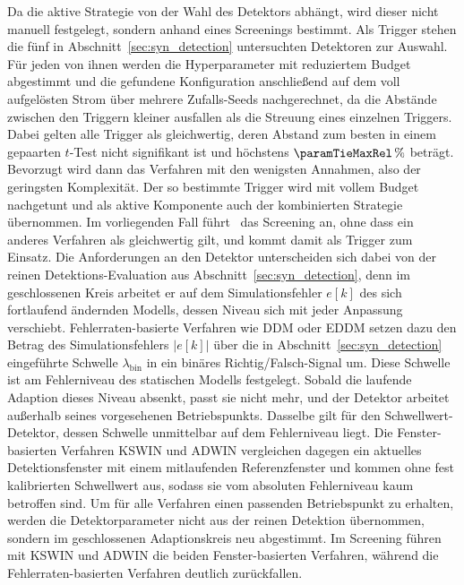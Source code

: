 Da die aktive Strategie von der Wahl des Detektors abhängt, wird dieser nicht manuell festgelegt, sondern anhand eines Screenings bestimmt. Als Trigger stehen die fünf in Abschnitt~\ref{sec:syn_detection} untersuchten Detektoren zur Auswahl. Für jeden von ihnen werden die Hyperparameter mit reduziertem Budget abgestimmt und die gefundene Konfiguration anschließend auf dem voll aufgelösten Strom über mehrere Zufalls-Seeds nachgerechnet, da die Abstände zwischen den Triggern kleiner ausfallen als die Streuung eines einzelnen Triggers. Dabei gelten alle Trigger als gleichwertig, deren Abstand zum besten in einem gepaarten $t$-Test nicht signifikant ist und höchstens $\paramTieMaxRel\,\%$ beträgt. Bevorzugt wird dann das Verfahren mit den wenigsten Annahmen, also der geringsten Komplexität. Der so bestimmte Trigger wird mit vollem Budget nachgetunt und als aktive Komponente auch der kombinierten Strategie übernommen. Im vorliegenden Fall führt \adaptScreenLead\ das Screening an, ohne dass ein anderes Verfahren als gleichwertig gilt, und kommt damit als Trigger zum Einsatz. Die Anforderungen an den Detektor unterscheiden sich dabei von der reinen Detektions-Evaluation aus Abschnitt~\ref{sec:syn_detection}, denn im geschlossenen Kreis arbeitet er auf dem Simulationsfehler $e[k]$ des sich fortlaufend ändernden Modells, dessen Niveau sich mit jeder Anpassung verschiebt.
Fehlerraten-basierte Verfahren wie \ac{DDM} oder \ac{EDDM} setzen dazu den Betrag des Simulationsfehlers $|e[k]|$ über die in Abschnitt~\ref{sec:syn_detection} eingeführte Schwelle $\lambda_{\mathrm{bin}}$ in ein binäres Richtig/Falsch-Signal um. Diese Schwelle ist am Fehlerniveau des statischen Modells festgelegt. Sobald die laufende Adaption dieses Niveau absenkt, passt sie nicht mehr, und der Detektor arbeitet außerhalb seines vorgesehenen Betriebspunkts. Dasselbe gilt für den Schwellwert-Detektor, dessen Schwelle unmittelbar auf dem Fehlerniveau liegt. Die Fenster-basierten Verfahren \ac{KSWIN} und \ac{ADWIN} vergleichen dagegen ein aktuelles Detektionsfenster mit einem mitlaufenden Referenzfenster und kommen ohne fest kalibrierten Schwellwert aus, sodass sie vom absoluten Fehlerniveau kaum betroffen sind. Um für alle Verfahren einen passenden Betriebspunkt zu erhalten, werden die Detektorparameter nicht aus der reinen Detektion übernommen, sondern im geschlossenen Adaptionskreis neu abgestimmt. Im Screening führen mit \ac{KSWIN} und \ac{ADWIN} die beiden Fenster-basierten Verfahren, während die Fehlerraten-basierten Verfahren deutlich zurückfallen. \par
